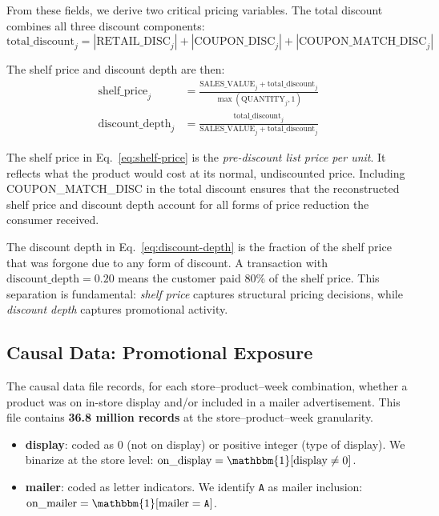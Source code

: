 \documentclass[12pt,a4paper]{article}
\begin{document}
From these fields, we derive two critical pricing variables. The
total discount combines all three discount components:
\begin{equation}
\label{eq:total-discount}
\text{total\_discount}_j = |\text{RETAIL\_DISC}_j|
+ |\text{COUPON\_DISC}_j| + |\text{COUPON\_MATCH\_DISC}_j|
\end{equation}

The shelf price and discount depth are then:
\begin{align}
\text{shelf\_price}_j &= \frac{\text{SALES\_VALUE}_j +
\text{total\_discount}_j}
{\max(\text{QUANTITY}_j, 1)}
\label{eq:shelf-price}
\\[4pt]
\text{discount\_depth}_j &= \frac{\text{total\_discount}_j}
{\text{SALES\_VALUE}_j + \text{total\_discount}_j}
\label{eq:discount-depth}
\end{align}

The shelf price in Eq.~\eqref{eq:shelf-price} is the
\emph{pre-discount list price per unit}. It reflects what the product
would cost at its normal, undiscounted price. Including
COUPON\_MATCH\_DISC in the total discount ensures that the
reconstructed shelf price and discount depth account for all forms
of price reduction the consumer received.

The discount depth in
Eq.~\eqref{eq:discount-depth} is the fraction of the shelf price
that was forgone due to any form of discount. A transaction
with $\text{discount\_depth} = 0.20$ means the customer paid 80\% of
the shelf price. This separation is fundamental: \emph{shelf price}
captures structural pricing decisions, while \emph{discount depth}
captures promotional activity.

\subsection{Causal Data: Promotional Exposure}

The causal data file records, for each store--product--week
combination, whether a product was on in-store display and/or
included in a mailer advertisement. This file contains
\textbf{36.8 million records} at the store--product--week
granularity.

\begin{itemize}[nosep]
\item \textbf{display}: coded as $0$ (not on display) or positive
integer (type of display). We binarize at the store level:
$\text{on\_display} = \mathbbm{1}[\text{display} \neq 0]$.

\item \textbf{mailer}: coded as letter indicators. We identify
\texttt{A} as mailer inclusion:
$\text{on\_mailer} = \mathbbm{1}[\text{mailer} = \texttt{A}]$.
\end{itemize}
\end{document}
